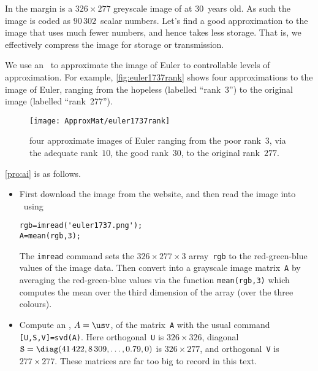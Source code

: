 \begin{example} \label{eg:euler1737}
In the margin is a \(326\times277\) greyscale image of  at 30~years old.  
As such the image is coded as \(90\,302\)~scalar numbers.
Let's find a good approximation to the image that uses much fewer numbers, and hence takes less storage.
That is, we effectively compress the image for storage or transmission.

\begin{solution} 
We use an \svd\ to approximate the image of Euler to controllable levels of approximation.
For example, \autoref{fig:euler1737rank} shows four approximations to the image of Euler, ranging from the hopeless (labelled ``rank~3'')  to the original image (labelled ``rank~277'').
\begin{figure}
\caption{four approximate images of Euler ranging from the poor rank~\(3\), via the adequate rank~\(10\), the good rank~\(30\), to the original rank~\(277\).}
\label{fig:euler1737rank}
\centering
\texttt{[image: ApproxMat/euler1737rank]}
\end{figure}

\autoref{pro:ai} is as follows.
\begin{itemize}
\item First download the image from the website, and then read the image into \script\ using 
\begin{verbatim}
rgb=imread('euler1737.png');
A=mean(rgb,3);
\end{verbatim}
The \verb|imread| command sets the \(326\times277\times3\) array~\verb|rgb| to the red-green-blue values of the image data. 
Then convert into a grayscale image matrix~\verb|A| by averaging the red-green-blue values via the function \verb|mean(rgb,3)| which computes the mean over the third dimension of the array (over the three colours).

\item Compute an \svd, \(A=\usv\), of the matrix~\verb|A| with the usual command \verb|[U,S,V]=svd(A)|.
Here orthogonal~\verb|U| is \(326\times326\), diagonal \(\verb|S|=\diag(41\,422, 8\,309,  \ldots,0.79,0)\) is \(326\times277\), and orthogonal~\verb|V| is \(277\times277\).
These matrices are far too big to record in this text.
\setbox\ajrqrbox\hbox{}%
\marginpar{\usebox{\ajrqrbox\\[2ex]}}%



\end{itemize}
\end{solution}
\end{example}
